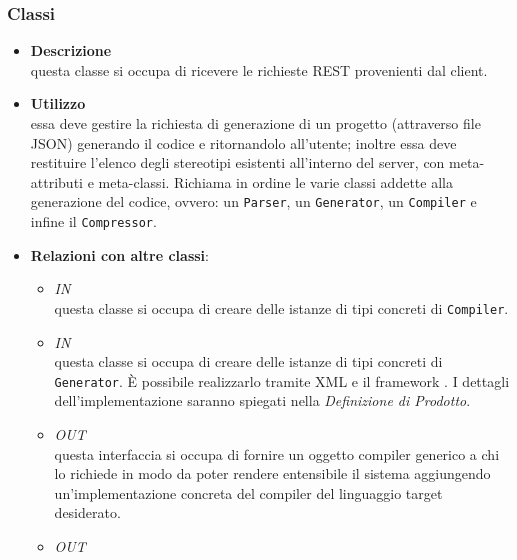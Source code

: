 \subsubsection{Classi}
\label{\nogloxy{swedesigner::server::controller::RequestHandlerController}}
\begin{itemize}
\item \textbf{Descrizione}\\
questa classe si occupa di ricevere le richieste REST provenienti dal client.
\item \textbf{Utilizzo}\\
essa deve gestire la richiesta di generazione di un progetto (attraverso file JSON) generando il codice e ritornandolo all'utente; inoltre essa deve restituire l'elenco degli stereotipi esistenti all'interno del server, con meta-attributi e meta-classi.
Richiama in ordine le varie classi addette alla generazione del codice, ovvero: un \texttt{Parser}, un \texttt{Generator}, un \texttt{Compiler} e infine il \texttt{Compressor}. 
\item \textbf{Relazioni con altre classi}:
\begin{itemize}
\item \textit{IN} \hyperref[\nogloxy{swedesigner::server::compiler::CompilerAssembler}]{}\\
questa classe si occupa di creare delle istanze di tipi concreti di \texttt{Compiler}. 
\item \textit{IN} \hyperref[\nogloxy{swedesigner::server::generator::GeneratorAssembler}]{}\\
questa classe si occupa di creare delle istanze di tipi concreti di \texttt{Generator}. È possibile realizzarlo tramite XML e il framework \spring. I dettagli dell'implementazione saranno spiegati nella \emph{Definizione di Prodotto}. %
\item \textit{OUT} \hyperref[\nogloxy{swedesigner::server::compiler::Compiler}]{}\\
questa interfaccia si occupa di fornire un oggetto compiler generico a chi lo richiede in modo da poter rendere entensibile il sistema aggiungendo un'implementazione concreta del compiler del linguaggio target desiderato.
\item \textit{OUT} \hyperref[\nogloxy{swedesigner::server::generator::Generator}]{}\\

\end{itemize}
\end{itemize}
